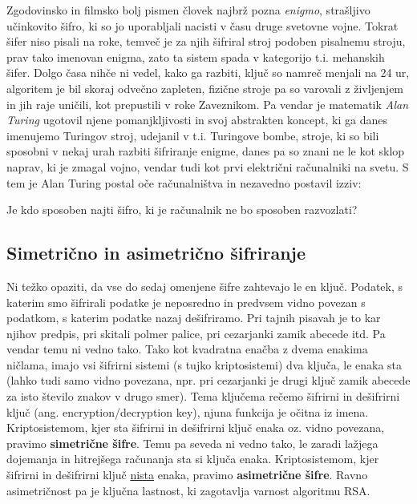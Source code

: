 \documentclass[a4paper, 12pt]{article} %
\begin{document}
Zgodovinsko in filmsko bolj pismen človek najbrž pozna \emph{enigmo}, strašljivo učinkovito šifro, ki so jo uporabljali nacisti v času druge svetovne vojne. Tokrat šifer niso pisali na roke, temveč je za njih šifriral stroj podoben pisalnemu stroju, prav tako imenovan enigma, zato ta sistem spada v kategorijo t.i. mehanskih šifer. Dolgo časa nihče ni vedel, kako ga razbiti, ključ so namreč menjali na 24 ur, algoritem je bil skoraj odvečno zapleten, fizične stroje pa so varovali z življenjem in jih raje uničili, kot prepustili v roke Zaveznikom. Pa vendar je matematik \emph{Alan Turing} ugotovil njene pomanjkljivosti in svoj abstrakten koncept, ki ga danes imenujemo Turingov stroj, udejanil v t.i. Turingove bombe, stroje, ki so bili sposobni v nekaj urah razbiti šifriranje enigme, danes pa so znani ne le kot sklop naprav, ki je zmagal vojno, vendar tudi kot prvi električni računalniki na svetu. S tem je Alan Turing postal oče računalništva in nezavedno postavil izziv:

Je kdo sposoben najti šifro, ki je računalnik ne bo sposoben razvozlati?

\subsection{Simetrično in asimetrično šifriranje}

Ni težko opaziti, da vse do sedaj omenjene šifre zahtevajo le en ključ. Podatek, s katerim smo šifrirali podatke je neposredno in predvsem vidno povezan s podatkom, s katerim podatke nazaj dešifriramo. Pri tajnih pisavah je to kar njihov predpis, pri skitali polmer palice, pri cezarjanki zamik abecede itd. Pa vendar temu ni vedno tako. Tako kot kvadratna enačba z dvema enakima ničlama, imajo vsi šifrirni sistemi (s tujko kriptosistemi) dva ključa, le enaka sta (lahko tudi samo vidno povezana, npr. pri cezarjanki je drugi ključ zamik abecede za isto število znakov v drugo smer). Tema ključema rečemo šifrirni in dešifrirni ključ (ang. encryption/decryption key), njuna funkcija je očitna iz imena.
\newline
\newline
Kriptosistemom, kjer sta šifrirni in dešifrirni ključ enaka oz. vidno povezana, pravimo \textbf{simetrične šifre}. Temu pa seveda ni vedno tako, le zaradi lažjega dojemanja in hitrejšega računanja sta si ključa enaka. Kriptosistemom, kjer šifrirni in dešifrirni ključ \underline{nista} enaka, pravimo \textbf{asimetrične šifre}. Ravno asimetričnost pa je ključna lastnost, ki zagotavlja varnost algoritmu RSA.
\end{document}

